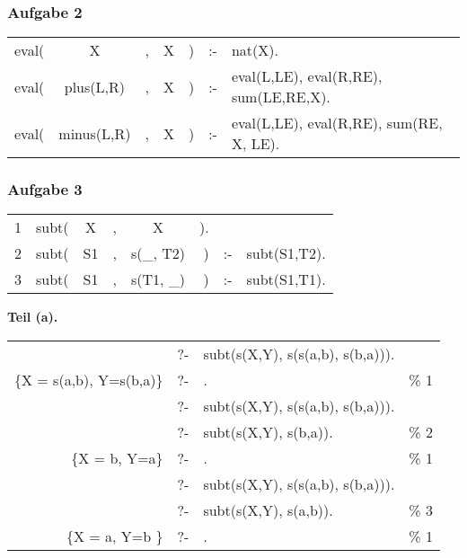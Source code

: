 \documentclass[aspectratio=1610,onlymath, ngerman]{beamer}
\renewcommand{\emph}[1]{\textbf{#1}}
\begin{document}
    \begin{frame} \frametitle{Aufgabe 2}
    \small
    	\setlength{\tabcolsep}{2pt}
   		\begin{tabular}{>{\ttfamily}l >{\ttfamily}c >{\ttfamily}c >{\ttfamily}c >{\ttfamily}r >{\ttfamily}c >{\ttfamily}l}
	   		eval( & X         &, &X &) & :- & nat(X). \\
	   		eval( & plus(L,R) &, &X &) & :- & eval(L,LE), eval(R,RE), sum(LE,RE,X). \\
	   		eval( & minus(L,R) &, &X &) & :- & eval(L,LE), eval(R,RE), sum(RE, X, LE).
   		\end{tabular}
	\end{frame}
    
    \begin{frame} \frametitle{Aufgabe 3}
    \small
	    \setlength{\tabcolsep}{2pt}
	    \begin{tabular}{>{\ttfamily\scriptsize}l >{\ttfamily}l >{\ttfamily}c >{\ttfamily}c >{\ttfamily}c >{\ttfamily}r >{\ttfamily}c >{\ttfamily}l}
	    	1 & subt( & X         &, &X &).&& \\
	    	2 & subt( & S1 &, &s(\_, T2) &) & :- & subt(S1,T2). \\
	    	3 & subt( & S1 &, &s(T1, \_) &) & :- & subt(S1,T1). \\
	    \end{tabular}
    
    	\bigskip \pause
    	
    	\emph{Teil (a).}
    	
    \footnotesize
    
    	\begin{tabular}{>{\ttfamily}r l >{\ttfamily}l >{\ttfamily}l}
    		& ?- & subt(s(X,Y), s(s(a,b), s(b,a))). \\
    		\{X = s(a,b), Y=s(b,a)\} & ?- & . & \% 1 \\[9pt] %
    		& ?- & subt(s(X,Y), s(s(a,b), s(b,a))). \\
    		& ?- & subt(s(X,Y), s(b,a)). & \% 2 \\
    		\{X = b, Y=a\} & ?- & . & \% 1 \\[9pt]
	    	& ?- & subt(s(X,Y), s(s(a,b), s(b,a))). \\
	    	& ?- & subt(s(X,Y), s(a,b)). & \% 3 \\
	    	\{X = a, Y=b \} & ?- & . & \% 1
	    \end{tabular}
	\end{frame}
\end{document}
